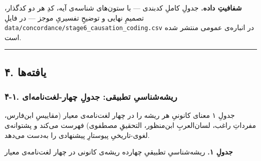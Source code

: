\begin{RTL}
\begin{otherlanguage}{persian}
\textbf{شفافیتِ داده.} جدولِ کاملِ کدبندی --- با ستون‌های شناسه‌ی آیه، کدِ هر
دو کدگذار، تصمیمِ نهایی و توضیحِ تفسیریِ موجز --- در فایلِ
\texttt{data/concordance/stage6\_causation\_coding.csv} در انباره‌ی عمومی
منتشر شده است.

\begin{center}\rule{0.5\linewidth}{0.5pt}\end{center}

\subsection{۴. یافته‌ها}\label{ux6ccux627ux641ux62aux647ux647ux627}

\subsubsection{۴-۱. ریشه‌شناسیِ تطبیقی: جدولِ
چهار-لغت‌نامه‌ای}\label{ux631ux6ccux634ux647ux634ux646ux627ux633ux6cc-ux62aux637ux628ux6ccux642ux6cc-ux62cux62fux648ux644-ux686ux647ux627ux631-ux644ux63aux62aux646ux627ux645ux647ux627ux6cc}

جدولِ ۱ معنای کانونیِ هر ریشه را در چهار لغت‌نامه‌ی معیار (مقاییسِ ابن‌فارس،
مفرداتِ راغب، لسان‌العربِ ابن‌منظور، التحقیقِ مصطفوی) فهرست می‌کند و پشتوانه‌ی
لغوی-تاریخیِ پیوستارِ پیشنهادی را به‌دست می‌دهد.

\textbf{جدولِ ۱.} ریشه‌شناسیِ تطبیقیِ چهارده ریشه‌ی کانونی در چهار لغت‌نامه‌ی
معیار


\end{otherlanguage}
\end{RTL}
